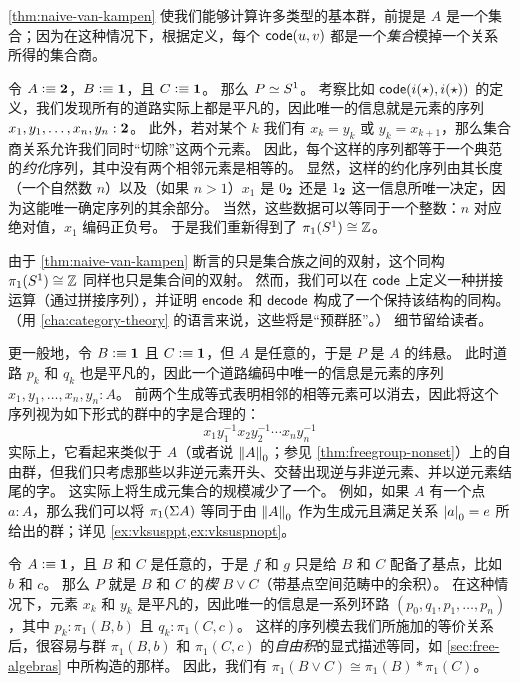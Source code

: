%

\cref{thm:naive-van-kampen} 使我们能够计算许多类型的基本群，前提是 $A$ 是一个集合；因为在这种情况下，根据定义，每个 $\code(u,v)$ 都是一个\emph{集合}模掉一个关系所得的集合商。

\begin{eg}\label{eg:circle}
  令 $A\defeq \bool$，$B\defeq\unit$，且 $C\defeq \unit$。
  那么 $P \eqvsym S^1$。
  考察比如 $\code(i(\ttt),i(\ttt))$ 的定义，我们发现所有的道路实际上都是平凡的，因此唯一的信息就是元素的序列 $x_1,y_1,\dots,x_n,y_n: \bool$。
  此外，若对某个 $k$ 我们有 $x_k=y_k$ 或 $y_k=x_{k+1}$，那么集合商关系允许我们同时``切除''这两个元素。
  因此，每个这样的序列都等于一个典范的\emph{约化}序列，其中没有两个相邻元素是相等的。
  显然，这样的约化序列由其长度（一个自然数 $n$）以及（如果 $n>1$）$x_1$ 是 $\bfalse$ 还是 $\btrue$ 这一信息所唯一决定，因为这能唯一确定序列的其余部分。
  当然，这些数据可以等同于一个整数：$n$ 对应绝对值，$x_1$ 编码正负号。
  于是我们重新得到了 $\pi_1(S^1)\cong \Z$。
\end{eg}

由于 \cref{thm:naive-van-kampen} 断言的只是集合族之间的双射，这个同构 $\pi_1(S^1)\cong \Z$ 同样也只是集合间的双射。
然而，我们可以在 $\code$ 上定义一种拼接运算（通过拼接序列），并证明 $\encode$ 和 $\decode$ 构成了一个保持该结构的同构。
（用 \cref{cha:category-theory} 的语言来说，这些将是``预群胚''。）
细节留给读者。

%

\begin{eg}\label{eg:suspension}
  更一般地，令 $B\defeq\unit$ 且 $C\defeq \unit$，但 $A$ 是任意的，于是 $P$ 是 $A$ 的纬悬。
  此时道路 $p_k$ 和 $q_k$ 也是平凡的，因此一个道路编码中唯一的信息是元素的序列 $x_1,y_1,\dots,x_n,y_n: A$。
  前两个生成等式表明相邻的相等元素可以消去，因此将这个序列视为如下形式的群中的字是合理的：
  \[ x_1 y_1^{-1} x_2 y_2^{-1} \cdots x_n y_n^{-1} \]
  实际上，它看起来类似于 $A$（或者说 $\trunc0A$；参见 \cref{thm:freegroup-nonset}）上的自由群，但我们只考虑那些以非逆元素开头、交替出现逆与非逆元素、并以逆元素结尾的字。
  这实际上将生成元集合的规模减少了一个。
  例如，如果 $A$ 有一个点 $a:A$，那么我们可以将 $\pi_1(\susp A)$ 等同于由 $\trunc0A$ 作为生成元且满足关系 $\tproj0a = e$ 所给出的群；详见 \cref{ex:vksusppt,ex:vksuspnopt}。
\end{eg}

\begin{eg}\label{eg:wedge}
  令 $A\defeq\unit$，且 $B$ 和 $C$ 是任意的，于是 $f$ 和 $g$ 只是给 $B$ 和 $C$ 配备了基点，比如 $b$ 和 $c$。
  那么 $P$ 就是 $B$ 和 $C$ 的\emph{楔} $B\vee C$（带基点空间范畴中的余积）。
  在这种情况下，元素 $x_k$ 和 $y_k$ 是平凡的，因此唯一的信息是一系列环路 $(p_0,q_1,p_1,\dots,p_n)$，其中 $p_k:\pi_1(B,b)$ 且 $q_k:\pi_1(C,c)$。
  这样的序列模去我们所施加的等价关系后，很容易与群 $\pi_1(B,b)$ 和 $\pi_1(C,c)$ 的\emph{自由积}的显式描述等同，如 \cref{sec:free-algebras} 中所构造的那样。
  因此，我们有 $\pi_1(B\vee C) \cong \pi_1(B) * \pi_1(C)$。
\end{eg}

